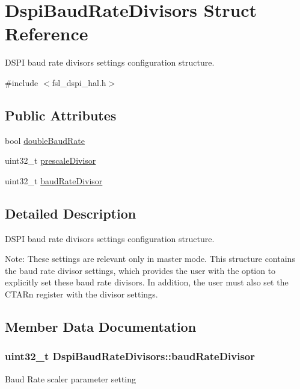 \hypertarget{structDspiBaudRateDivisors}{}\section{Dspi\+Baud\+Rate\+Divisors Struct Reference}
\label{structDspiBaudRateDivisors}


D\+S\+PI baud rate divisors settings configuration structure.  




{\ttfamily \#include $<$fsl\+\_\+dspi\+\_\+hal.\+h$>$}

\subsection*{Public Attributes}
\begin{DoxyCompactItemize}
\item 
bool \hyperlink{structDspiBaudRateDivisors_a9033a92322a6c09c14fda53c0a30ee8a}{double\+Baud\+Rate}
\item 
uint32\+\_\+t \hyperlink{structDspiBaudRateDivisors_a251394cd7f2814166f5ec7fe5ea23de0}{prescale\+Divisor}
\item 
uint32\+\_\+t \hyperlink{structDspiBaudRateDivisors_acc76829281ddb9966694c198c4ff8529}{baud\+Rate\+Divisor}
\end{DoxyCompactItemize}


\subsection{Detailed Description}
D\+S\+PI baud rate divisors settings configuration structure. 

Note\+: These settings are relevant only in master mode. This structure contains the baud rate divisor settings, which provides the user with the option to explicitly set these baud rate divisors. In addition, the user must also set the C\+T\+A\+Rn register with the divisor settings. 

\subsection{Member Data Documentation}
\subsubsection[{\texorpdfstring{baud\+Rate\+Divisor}{baudRateDivisor}}]{\setlength{\rightskip}{0pt plus 5cm}uint32\+\_\+t Dspi\+Baud\+Rate\+Divisors\+::baud\+Rate\+Divisor}\hypertarget{structDspiBaudRateDivisors_acc76829281ddb9966694c198c4ff8529}{}\label{structDspiBaudRateDivisors_acc76829281ddb9966694c198c4ff8529}
Baud Rate scaler parameter setting 
